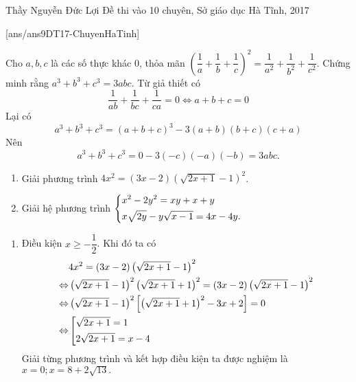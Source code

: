 \begin{name}
{Thầy Nguyễn Đức Lợi}
{Đề thi vào 10 chuyên, Sở giáo dục Hà Tĩnh, 2017}
\end{name}
\setcounter{ex}{0}
[ans/ans9DT17-ChuyenHaTinh]
\begin{ex}%
   Cho $a,b,c$ là các số thực khác $0$, thỏa mãn $\left(\dfrac{1}{a}+\dfrac{1}{b}+\dfrac{1}{c}\right)^2=\dfrac{1}{a^2}+\dfrac{1}{b^2}+\dfrac{1}{c^2}$. Chứng minh rằng $a^3+b^3+c^3=3abc$.
\loigiai
    {Từ giả thiết có
    $$\dfrac{1}{ab}+\dfrac{1}{bc}+\dfrac{1}{ca}=0 \Leftrightarrow a+b+c=0$$
    Lại có
    $$a^3+b^3+c^3=(a+b+c)^3-3(a+b)(b+c)(c+a)$$
    Nên 
    $$a^3+b^3+c^3=0-3(-c)(-a)(-b)=3abc.$$
    }
\end{ex}

\begin{ex}%
\hfill
    \begin{enumerate}    
        \item Giải phương trình $4x^2=(3x-2)\left(\sqrt{2x+1}-1\right)^2$.
        \item Giải hệ phương trình $\left\{\begin{aligned}&x^2-2y^2=xy+x+y\\&x\sqrt{2y}-y\sqrt{x-1}=4x-4y.\end{aligned}\right.$
    \end{enumerate}
\loigiai
    {\begin{enumerate}
    \item Điều kiện $x \ge -\dfrac{1}{2}$. Khi đó ta có
    \begin{align*}
    &4x^2=(3x-2)\left(\sqrt{2x+1}-1\right)^2\\
    \Leftrightarrow &\left(\sqrt{2x+1}-1\right)^2\left(\sqrt{2x+1}+1\right)^2=(3x-2)\left(\sqrt{2x+1}-1\right)^2\\
    \Leftrightarrow & \left(\sqrt{2x+1}-1\right)^2\left[\left(\sqrt{2x+1}+1\right)^2-3x+2\right]=0\\
    \Leftrightarrow & \left[\begin{aligned}&\sqrt{2x+1}=1\\&2\sqrt{2x+1}=x-4\end{aligned}\right.
    \end{align*}
    Giải từng phương trình và kết hợp điều kiện ta được nghiệm là $x=0;x=8+2\sqrt{13}.$
    

\end{enumerate}}
\end{ex}
